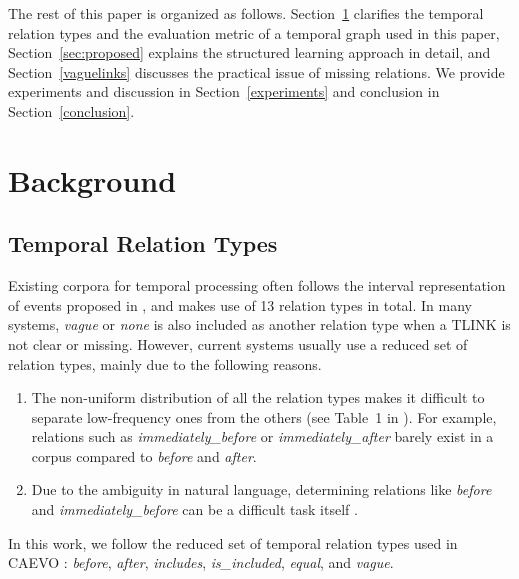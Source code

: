 \documentclass[11pt,letterpaper]{article}
\newcommand{\ignore}[1]{}
\begin{document}
The rest of this paper is organized as follows. Section~\ref{sec:background} clarifies the temporal relation types and the evaluation metric of a temporal graph used in this paper, Section~\ref{sec:proposed} explains the structured learning approach in detail, and Section~\ref{vaguelinks} discusses the practical issue of missing relations. 
We provide experiments and discussion in Section~\ref{experiments} and conclusion in Section~\ref{conclusion}.

%
 	\section{Background}
\label{sec:background}
\subsection{Temporal Relation Types}
Existing corpora for temporal processing often follows the interval representation of events proposed in \citet{allen1984towards}, and makes use of 13 relation types in total.
In many systems, \textit{vague} or \textit{none} is also included as another relation type when a TLINK is not clear or missing.
However, current systems usually use a reduced set of relation types, mainly due to the following reasons.
\begin{enumerate}
	\item The non-uniform distribution of all the relation types makes it difficult to separate low-frequency ones from the others (see Table~1 in \citet{mani2006machine}). For example, relations such as \textit{immediately\_before} or \textit{immediately\_after} barely exist in a corpus compared to \textit{before} and \textit{after}.
	\item Due to the ambiguity in natural language, determining relations like \textit{before} and \textit{immediately\_before} can be a difficult task itself  \citep{chambers2014dense}.
\end{enumerate}
\ignore{In \citet{bethard2007timelines} and \citet{DoLuRo12}, only 5 relations were considered: \textit{before}, \textit{after}, \textit{overlap}, \textit{equal} and \textit{none}; CAEVO \citep{chambers2014dense} uses 6 relations: \textit{before}, \textit{after}, \textit{includes}, \textit{is\_included}, \textit{equal}, and \textit{vague}.
In this work, we follow the reduced set of temporal relation types used in CAEVO because it not only covers all the dominating relations but also has a fine-grained distinction of the relation \textit{overlap}.}
In this work, we follow the reduced set of temporal relation types used in CAEVO \citep{chambers2014dense}: \textit{before}, \textit{after}, \textit{includes}, \textit{is\_included}, \textit{equal}, and \textit{vague}.
\end{document}
